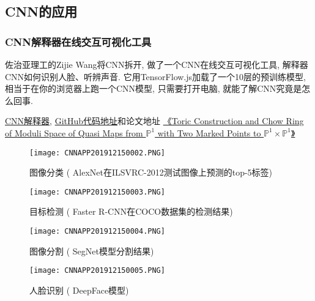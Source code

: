 \subsection{CNN的应用}
\subsubsection{CNN解释器在线交互可视化工具}
佐治亚理工的Zijie Wang将CNN拆开, 做了一个CNN在线交互可视化工具,  解释器CNN如何识别人脸、听辨声音.
它用TensorFlow.js加载了一个10层的预训练模型, 相当于在你的浏览器上跑一个CNN模型, 只需要打开电脑, 就能了解CNN究竟是怎么回事.

\href{https://poloclub.github.io/cnn-explainer/}{CNN解释器}, \href{https://github.com/poloclub/cnn-explainer}{GitHub代码地址}和论文地址
\href{https://arxiv.org/abs/2004.1500}{《Toric Construction and Chow Ring of Moduli Space of Quasi Maps from $\mathbb P^1$ with Two Marked Points to $\mathbb P^1\times \mathbb P^1$》}
\begin{figure}[H]
    \centering
    \texttt{[image: CNNAPP201912150002.PNG]}
    \caption{图像分类 ( AlexNet在ILSVRC-2012测试图像上预测的top-5标签)}
    \label{CNNAPP201912150002}
    \vspace{-0.4cm}
\end{figure}
\begin{figure}[H]
    \centering
    \texttt{[image: CNNAPP201912150003.PNG]}
    \caption{目标检测 ( Faster R-CNN在COCO数据集的检测结果)}
    \label{CNNAPP201912150003}
    \vspace{-0.4cm}
\end{figure}
\begin{figure}[H]
    \centering
    \texttt{[image: CNNAPP201912150004.PNG]}
    \caption{图像分割 ( SegNet模型分割结果)}
    \label{CNNAPP201912150004}
    \vspace{-0.4cm}
\end{figure}
\begin{figure}[H]
    \centering
    \texttt{[image: CNNAPP201912150005.PNG]}
    \caption{人脸识别 ( DeepFace模型)}
    \label{CNNAPP201912150005}
    \vspace{-0.4cm}
\end{figure}
